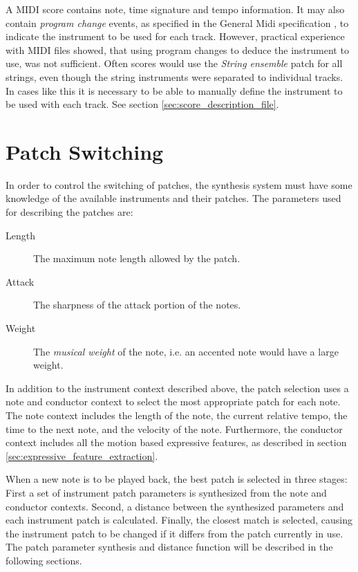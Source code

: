 A MIDI score contains note, time signature and tempo information.
It may also contain \textit{program change} events,
as specified in the General Midi specification \cite{GeneralMidi},
to indicate the instrument to be used for each track.
However, practical experience with MIDI files showed,
that using program changes to deduce the instrument to use,
was not sufficient.
Often scores would use the
\textit{String ensemble} patch for all strings,
even though the string instruments were separated to individual tracks.
In cases like this it is necessary to be able to manually
define the instrument to be used with each track.
See section \ref{sec:score_description_file}.

\section{Patch Switching}
\label{sec:patch_switching}

In order to control the switching of patches,
the synthesis system must have some knowledge of
the available instruments and their patches.
The parameters used for describing the patches are:
\begin{description}
\item[Length] The maximum note length allowed by the patch.
\item[Attack] The sharpness of the attack portion of the notes.
\item[Weight] The \textit{musical weight} of the note, i.e. an accented note would have a large weight.
\end{description}

In addition to the instrument context described above,
the patch selection uses a note and conductor context
to select the most appropriate patch for each note.
The note context includes
the length of the note,
the current relative tempo,
the time to the next note,
and the velocity of the note.
Furthermore, the conductor context includes
all the motion based expressive features,
as described in section \ref{sec:expressive_feature_extraction}.

When a new note is to be played back,
the best patch is selected in three stages:
First a set of instrument patch parameters is
synthesized from the note and conductor contexts.
Second, a distance between the synthesized parameters
and each instrument patch is calculated.
Finally, the closest match is selected,
causing the instrument patch to be changed
if it differs from the patch currently in use.
The patch parameter synthesis and distance function
will be described in the following sections.

